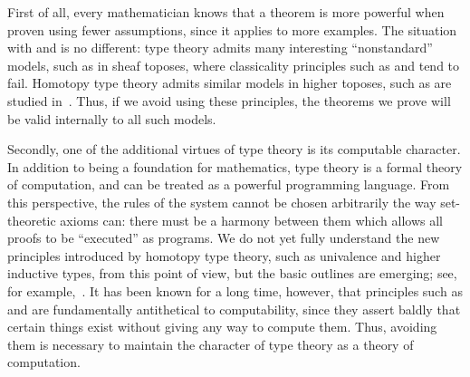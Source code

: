 First of all, every mathematician knows that a theorem is more powerful when proven using fewer assumptions, since it applies to more examples.
The situation with \choice{} and \LEM{} is no different:
type theory admits many interesting ``nonstandard'' models, such as in sheaf toposes, where classicality principles such as \choice{} and \LEM{} tend to fail.
Homotopy type theory admits similar models in higher toposes, such as are studied in~\cite{ToenVezzosi02,Rezk05,lurie:higher-topoi}.
Thus, if we avoid using these principles, the theorems we prove will be valid internally to all such models.

Secondly, one of the additional virtues of type theory is its computable character.
In addition to being a foundation for mathematics, type theory is a formal theory of computation, and can be treated as a powerful programming language.
%
From this perspective, the rules of the system cannot be chosen arbitrarily the way set-theoretic axioms can: there must be a harmony between them which allows all proofs to be ``executed'' as programs.
We do not yet fully understand the new principles introduced by homotopy type theory, such as univalence and higher inductive types, from
this point of view, but the basic outlines are emerging; see, for example,~\cite{lh:canonicity}.
It has been known for a long time, however, that principles such as \choice{} and \LEM{} are fundamentally antithetical to computability, since they assert baldly that certain things exist without giving any way to compute them.
Thus, avoiding them is necessary to maintain the character of type theory as a theory of computation.

